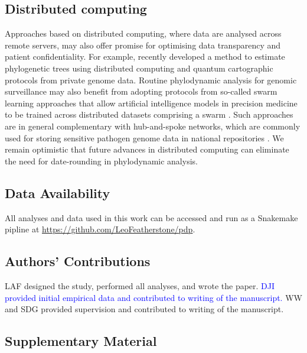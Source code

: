 \documentclass[12pt]{article}
\begin{document}
\begin{spacing}{2}
\subsection*{Distributed computing}
Approaches based on distributed computing, where data are analysed across remote servers, may also offer promise for optimising data transparency and patient confidentiality. For example, \citet{santos_private_2022} recently developed a method to estimate phylogenetic trees using distributed computing and quantum cartographic protocols from private genome data. Routine phylodynamic analysis for genomic surveillance may also benefit from adopting protocols from so-called swarm learning approaches that allow artificial intelligence models in precision medicine to be trained across distributed datasets comprising a swarm \citep{warnat-herresthal_swarm_2021}. Such approaches are in general complementary with hub-and-spoke networks, which are commonly used for storing sensitive pathogen genome data in national repositories \citep{hoang_austrakka_2022}. We remain optimistic that future advances in distributed computing can eliminate the need for date-rounding in phylodynamic analysis.

\subsection*{Data Availability}
All analyses and data used in this work can be accessed and run as a Snakemake pipline at \href{https://github.com/LeoFeatherstone/pdp}{https://github.com/LeoFeatherstone/pdp}.

\subsection*{Authors' Contributions}
LAF designed the study, performed all analyses, and wrote the paper. \textcolor{blue}{DJI provided initial empirical data and contributed to writing of the manuscript.} WW and SDG provided supervision and contributed to writing of the manuscript.

\end{spacing}




\subsection*{Supplementary Material}
\end{document}
